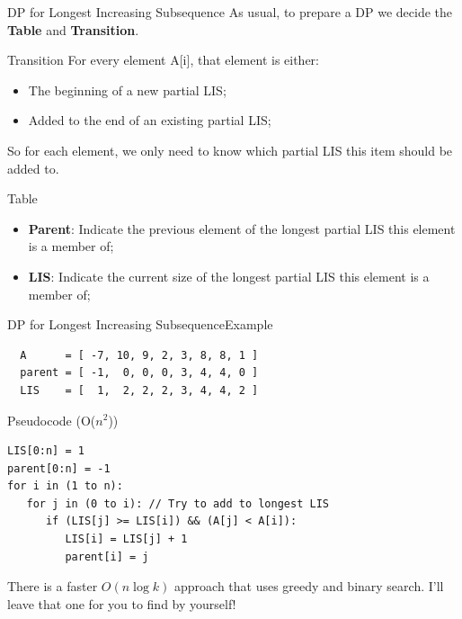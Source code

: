 \begin{frame}{DP for Longest Increasing Subsequence}
  As usual, to prepare a DP we decide the {\bf Table} and {\bf Transition}.

  \begin{block}{Transition}
    For every element A[i], that element is either:
    \begin{itemize}
      \item The beginning of a new partial LIS;
      \item Added to the end of an existing partial LIS;
    \end{itemize}
    So for each element, we only need to know which partial LIS this item should be added to.
  \end{block}

  \begin{exampleblock}{Table}
    \begin{itemize}
      \item {\bf Parent}: Indicate the previous element of the longest partial LIS this element is a member of;
      \item {\bf LIS}: Indicate the current size of the longest partial LIS this element is a member of;
    \end{itemize}
  \end{exampleblock}
\end{frame}

\begin{frame}[fragile]{DP for Longest Increasing Subsequence}{Example}
\begin{verbatim}
  A      = [ -7, 10, 9, 2, 3, 8, 8, 1 ]
  parent = [ -1,  0, 0, 0, 3, 4, 4, 0 ]
  LIS    = [  1,  2, 2, 2, 3, 4, 4, 2 ]
\end{verbatim}

\begin{block}{Pseudocode (O($n^2$))}
\begin{verbatim}
LIS[0:n] = 1
parent[0:n] = -1
for i in (1 to n):
   for j in (0 to i): // Try to add to longest LIS
      if (LIS[j] >= LIS[i]) && (A[j] < A[i]):
         LIS[i] = LIS[j] + 1
         parent[i] = j
\end{verbatim}
\end{block}

There is a faster $O(n\log k)$ approach that uses greedy and binary search. I'll leave that one for you to find by yourself!
\end{frame}


